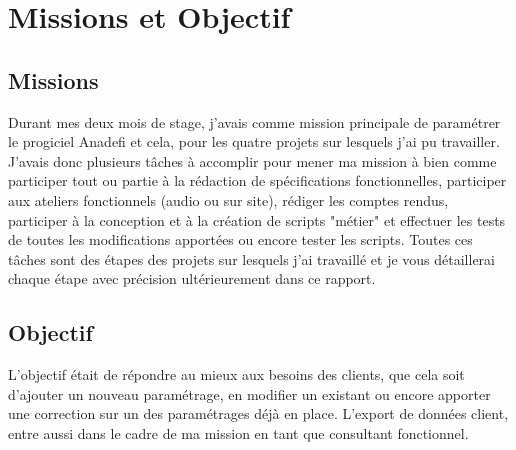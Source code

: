 \section{Missions et Objectif}

\subsection{Missions}
Durant mes deux mois de stage, j'avais comme mission principale de paramétrer le progiciel Anadefi et cela, pour les quatre projets sur lesquels j'ai pu travailler.\\

J'avais donc plusieurs tâches à accomplir pour mener ma mission à bien comme participer tout ou partie à la rédaction de spécifications fonctionnelles, participer aux ateliers fonctionnels (audio ou sur site), rédiger les comptes rendus, participer à la conception et à la création de scripts "métier" et effectuer les tests de toutes les modifications apportées ou encore tester les scripts.
Toutes ces tâches sont des étapes des projets sur lesquels j'ai travaillé et je vous détaillerai chaque étape avec précision ultérieurement dans ce rapport.\\


\subsection{Objectif}
L'objectif était de répondre au mieux aux besoins des clients, que cela soit d'ajouter un nouveau paramétrage, en modifier un existant ou encore apporter une correction sur un des paramétrages déjà en place. L'export de données client, entre aussi dans le cadre de ma mission en tant que consultant fonctionnel.\\



